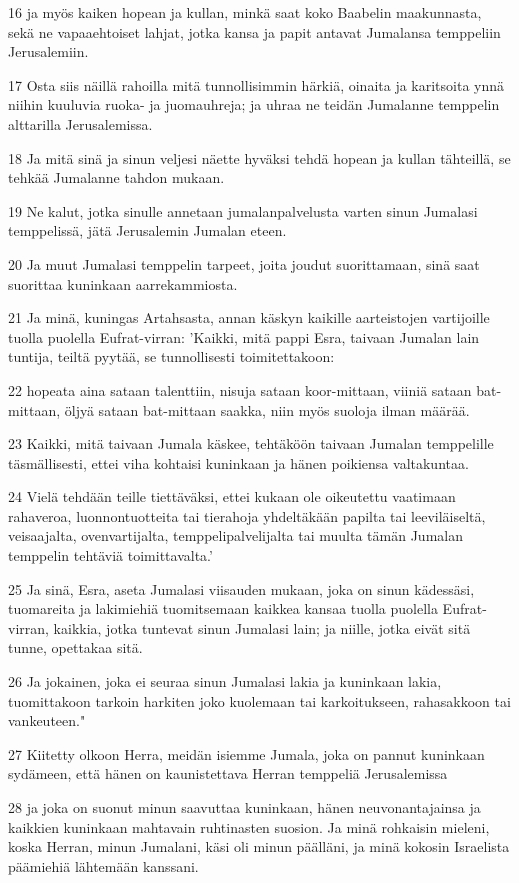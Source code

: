 \par 16 ja myös kaiken hopean ja kullan, minkä saat koko Baabelin maakunnasta, sekä ne vapaaehtoiset lahjat, jotka kansa ja papit antavat Jumalansa temppeliin Jerusalemiin.
\par 17 Osta siis näillä rahoilla mitä tunnollisimmin härkiä, oinaita ja karitsoita ynnä niihin kuuluvia ruoka- ja juomauhreja; ja uhraa ne teidän Jumalanne temppelin alttarilla Jerusalemissa.
\par 18 Ja mitä sinä ja sinun veljesi näette hyväksi tehdä hopean ja kullan tähteillä, se tehkää Jumalanne tahdon mukaan.
\par 19 Ne kalut, jotka sinulle annetaan jumalanpalvelusta varten sinun Jumalasi temppelissä, jätä Jerusalemin Jumalan eteen.
\par 20 Ja muut Jumalasi temppelin tarpeet, joita joudut suorittamaan, sinä saat suorittaa kuninkaan aarrekammiosta.
\par 21 Ja minä, kuningas Artahsasta, annan käskyn kaikille aarteistojen vartijoille tuolla puolella Eufrat-virran: 'Kaikki, mitä pappi Esra, taivaan Jumalan lain tuntija, teiltä pyytää, se tunnollisesti toimitettakoon:
\par 22 hopeata aina sataan talenttiin, nisuja sataan koor-mittaan, viiniä sataan bat-mittaan, öljyä sataan bat-mittaan saakka, niin myös suoloja ilman määrää.
\par 23 Kaikki, mitä taivaan Jumala käskee, tehtäköön taivaan Jumalan temppelille täsmällisesti, ettei viha kohtaisi kuninkaan ja hänen poikiensa valtakuntaa.
\par 24 Vielä tehdään teille tiettäväksi, ettei kukaan ole oikeutettu vaatimaan rahaveroa, luonnontuotteita tai tierahoja yhdeltäkään papilta tai leeviläiseltä, veisaajalta, ovenvartijalta, temppelipalvelijalta tai muulta tämän Jumalan temppelin tehtäviä toimittavalta.'
\par 25 Ja sinä, Esra, aseta Jumalasi viisauden mukaan, joka on sinun kädessäsi, tuomareita ja lakimiehiä tuomitsemaan kaikkea kansaa tuolla puolella Eufrat-virran, kaikkia, jotka tuntevat sinun Jumalasi lain; ja niille, jotka eivät sitä tunne, opettakaa sitä.
\par 26 Ja jokainen, joka ei seuraa sinun Jumalasi lakia ja kuninkaan lakia, tuomittakoon tarkoin harkiten joko kuolemaan tai karkoitukseen, rahasakkoon tai vankeuteen."
\par 27 Kiitetty olkoon Herra, meidän isiemme Jumala, joka on pannut kuninkaan sydämeen, että hänen on kaunistettava Herran temppeliä Jerusalemissa
\par 28 ja joka on suonut minun saavuttaa kuninkaan, hänen neuvonantajainsa ja kaikkien kuninkaan mahtavain ruhtinasten suosion. Ja minä rohkaisin mieleni, koska Herran, minun Jumalani, käsi oli minun päälläni, ja minä kokosin Israelista päämiehiä lähtemään kanssani.

